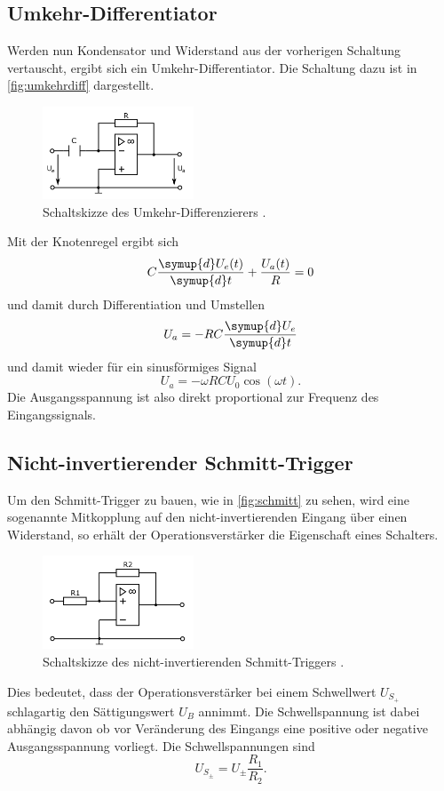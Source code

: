 \subsection{Umkehr-Differentiator}
Werden nun Kondensator und Widerstand aus der vorherigen Schaltung vertauscht, ergibt sich 
ein Umkehr-Differentiator. Die Schaltung dazu ist in \autoref{fig:umkehrdiff}
dargestellt.
\begin{figure}[H]
    \centering
    \includegraphics[width=0.4\textwidth]{diff.png}
    \caption{Schaltskizze des Umkehr-Differenzierers \cite{anleitung}.}
    \label{fig:umkehrdiff}
\end{figure}
Mit der Knotenregel ergibt sich
\begin{equation*}
    C \frac{\symup{d} U_e(t)}{\symup{d} t} + \frac{U_a(t)}{R} = 0
\end{equation*}
und damit durch Differentiation und Umstellen
\begin{equation*}
    U_a = - R C \frac{\symup{d}U_e}{\symup{d} t}
\end{equation*}
und damit wieder für ein sinusförmiges Signal 
\begin{equation*}
    U_a = - \omega R C U_0 \cos(\omega t).
\end{equation*}
Die Ausgangsspannung ist also direkt proportional zur Frequenz des Eingangssignals.

\subsection{Nicht-invertierender Schmitt-Trigger}
Um den Schmitt-Trigger zu bauen, wie in \autoref{fig:schmitt} zu sehen, wird eine sogenannte
Mitkopplung auf den nicht-invertierenden Eingang über einen Widerstand, so erhält der
Operationsverstärker die Eigenschaft eines Schalters.
\begin{figure}[H]
    \centering
    \includegraphics[width=0.4\textwidth]{schmitt.png}
    \caption{Schaltskizze des nicht-invertierenden Schmitt-Triggers \cite{anleitung}.}
    \label{fig:schmitt}
\end{figure}
Dies bedeutet, dass der Operationsverstärker
bei einem Schwellwert $U_{S_{+}}$ schlagartig den Sättigungswert $U_B$ annimmt.
Die Schwellspannung ist dabei abhängig davon ob vor Veränderung des Eingangs eine 
positive oder negative Ausgangsspannung vorliegt. 
Die Schwellspannungen sind 
\begin{equation*}
    U_{S_{\pm}} = U_{\pm} \frac{R_1}{R_2}.
\end{equation*}


